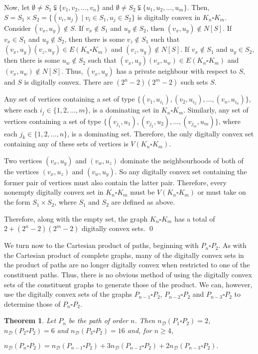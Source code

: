 \documentclass[12pt]{article}
\newtheorem{thm}{Theorem}[section]
\begin{document}
Now, let $\emptyset\neq S_1 \subsetneqq \{v_1,v_2,\dots,v_n\}$ and $\emptyset \neq S_2 \subsetneqq \{u_1,u_2,\dots,u_m\}$. Then, $S=S_1\times S_2 = \{(v_i,u_j)\mid v_i\in S_1,u_j\in S_2\}$ is digitally convex in $K_n\square K_m$. Consider $(v_x,u_y)\not\in S$. If $v_x\not\in S_1$ and $u_y\not\in S_2$, then $(v_x,u_y)\not\in N[S]$. If $v_x\in S_1$ and $u_y\not\in S_2$, then there is some $v_z\not\in S_1$ such that $(v_x,u_y)(v_z,u_y)\in E(K_n\square K_m)$ and $(v_z,u_y)\not\in N[S]$. If $v_x\not\in S_1$ and $u_y\in S_2$, then there is some $u_w\not\in S_2$ such that $(v_x,u_y)(v_x,u_w)\in E(K_n\square K_m)$ and $(v_x,u_w)\not\in N[S]$. Thus, $(v_x,u_y)$ has a private neighbour with respect to $S$, and $S$ is digitally convex. There are $(2^n-2)(2^m-2)$ such sets $S$. 

Any set of vertices containing a set of type $\{(v_1,u_{i_1}),(v_2,u_{i_2}), \dots, (v_n,u_{i_n})\}$, where each $i_j\in\{1,2,\dots,m\}$, is a dominating set in $K_n\square K_m$. Similarly, any set of vertices containing a set of type $\{(v_{j_1},u_1), (v_{j_2},u_2),\dots,(v_{j_m},u_m)\}$, where each $j_k\in\{1,2,\dots,n\}$, is a dominating set. Therefore, the only digitally convex set containing any of these sets of vertices is $V(K_n\square K_m)$. 

Two vertices $(v_x,u_y)$ and $(v_w,u_z)$ dominate the neighbourhoods of both of the vertices $(v_x,u_z)$ and $(v_w,u_y)$. So any digitally convex set containing the former pair of vertices must also contain the latter pair. Therefore, every nonempty digitally convex set in $K_n \square K_m$ must be $V(K_n\square K_m)$ or must take on the form $S_1 \times S_2$, where $S_1$ and $S_2$ are defined as above. 

Therefore, along with the empty set, the graph $K_n\square K_m$ has a total of $2+(2^n-2)(2^m-2)$ digitally convex sets. \qed

We turn now to the Cartesian product of paths, beginning with $P_n \square P_2$. As with the Cartesian product of complete graphs, many of the digitally convex sets in the product of paths are no longer digitally convex when restricted to one of the constituent paths. Thus, there is no obvious method of using the digitally convex sets of the constituent graphs to generate those of the product. We can, however, use the digitally convex sets of the graphs $P_{n-1}\square P_2$, $P_{n-2}\square P_2$ and $P_{n-3}\square P_2$ to determine those of $P_n\square P_2$. 

\begin{thm}
Let $P_n$ be the path of order $n$. Then $n_\mathscr{D}(P_1\square P_2) = 2$, $n_\mathscr{D}(P_2\square P_2) = 6$ and $n_\mathscr{D}(P_3\square P_2) = 16$ and, for $n\geq 4$, \begin{center}$n_\mathscr{D}(P_n\square P_2) = n_\mathscr{D}(P_{n-1}\square P_2)+3n_\mathscr{D}(P_{n-2}\square P_2)+2n_\mathscr{D}(P_{n-3}\square P_2).$\end{center}
\label{thm:pnp2recurrence}
\end{thm}
\end{document}
